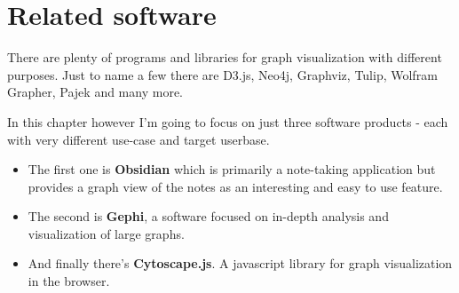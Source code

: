 




\chapter{Related software}

There are plenty of programs and libraries for graph visualization with different purposes.
Just to name a few there are D3.js, Neo4j, Graphviz, Tulip, Wolfram Grapher, Pajek and many more.

In this chapter however I'm going to focus on just three software products - each with very different use-case and target userbase.

\begin{itemize}

\item The first one is \textbf{Obsidian} which is primarily a note-taking application
but provides a graph view of the notes as an interesting and easy to use feature. 

\item The second is \textbf{Gephi}, a software focused on in-depth analysis and visualization of large graphs.

\item And finally there's \textbf{Cytoscape.js}. A javascript library for graph visualization in the browser.

\end{itemize}

